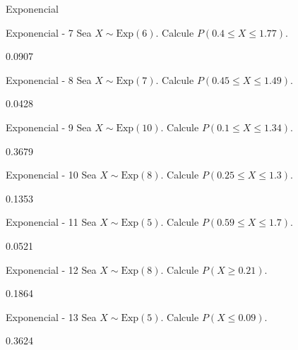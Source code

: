 \documentclass[a4,11pt]{aleph-notas}
\newcommand{\Exp}{\text{Exp}}
\begin{document}
\begin{quiz}{Exponencial}
\begin{numerical}[tolerance=0.001]%
    {Exponencial - 7}
    Sea \( X \sim \Exp(6) \). Calcule \( P(0.4 \leq X \leq 1.77) \).
    \item[] 0.0907
\end{numerical}

\begin{numerical}[tolerance=0.001]%
    {Exponencial - 8}
    Sea \( X \sim \Exp(7) \). Calcule \( P(0.45 \leq X \leq 1.49) \).
    \item[] 0.0428
\end{numerical}

\begin{numerical}[tolerance=0.001]%
    {Exponencial - 9}
    Sea \( X \sim \Exp(10) \). Calcule \( P(0.1 \leq X \leq 1.34) \).
    \item[] 0.3679
\end{numerical}

\begin{numerical}[tolerance=0.001]%
    {Exponencial - 10}
    Sea \( X \sim \Exp(8) \). Calcule \( P(0.25 \leq X \leq 1.3) \).
    \item[] 0.1353
\end{numerical}

\begin{numerical}[tolerance=0.001]%
    {Exponencial - 11}
    Sea \( X \sim \Exp(5) \). Calcule \( P(0.59 \leq X \leq 1.7) \).
    \item[] 0.0521
\end{numerical}

\begin{numerical}[tolerance=0.001]%
    {Exponencial - 12}
    Sea \( X \sim \Exp(8) \). Calcule \( P(X \geq 0.21) \).
    \item[] 0.1864
\end{numerical}

\begin{numerical}[tolerance=0.001]%
    {Exponencial - 13}
    Sea \( X \sim \Exp(5) \). Calcule \( P(X \leq 0.09) \).
    \item[] 0.3624
\end{numerical}


\end{quiz}
\end{document}
